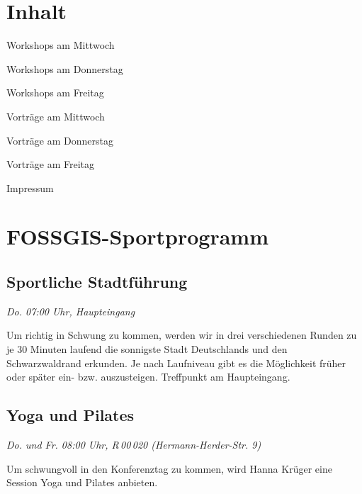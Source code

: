 \section*{Inhalt}
\label{contents}
\newlength\contentspace
\setlength\contentspace{0.2em}

\vspace*{\contentspace}%
\noindent Workshops am Mittwoch \dotfill \pageref{mittwoch-workshops}

\vspace*{\contentspace}%
\noindent Workshops am Donnerstag \dotfill \pageref{donnerstag-workshops}

\vspace*{\contentspace}%
\noindent Workshops am Freitag \dotfill \pageref{freitag-workshops}

\vspace*{\contentspace}%
\noindent Vorträge am Mittwoch \dotfill \pageref{mittwoch}

\vspace*{\contentspace}%
\noindent Vorträge am Donnerstag \dotfill \pageref{donnerstag}

\vspace*{\contentspace}%
\noindent Vorträge am Freitag \dotfill \pageref{freitag}

\vspace*{\contentspace}%
\noindent Impressum \dotfill \pageref{impressum}

\section*{FOSSGIS-Sportprogramm}\label{fruehsport}
\subsection*{Sportliche Stadtführung}

\emph{Do. 07:00 Uhr, Haupteingang}

\noindent Um richtig in Schwung zu kommen, werden wir in drei verschiedenen Runden
zu je 30 Minuten laufend die sonnigste Stadt Deutschlands und den
Schwarzwaldrand erkunden. Je nach Laufniveau gibt es die Möglichkeit
früher oder später ein- bzw. auszusteigen. Treffpunkt am Haupteingang.

\subsection*{Yoga und Pilates}

\emph{Do. und Fr. 08:00 Uhr, R\,00\,020 (Hermann-Herder-Str. 9)}

\noindent Um schwungvoll in den Konferenztag zu kommen, wird Hanna Krüger eine Session Yoga und Pilates anbieten.


\justifying

\newpage
